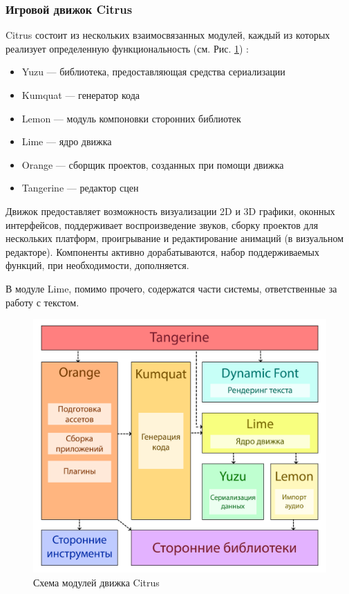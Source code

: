 \documentclass{fefu}
\begin{document}
			\subsubsection{Игровой движок Citrus}
				\par Citrus состоит из нескольких взаимосвязанных модулей, каждый из которых
				реализует определенную функциональность (см. Рис. \ref{img:CitrusScheme})
				\cite{CitrusRepo}: 
				\begin{itemize}
					\item Yuzu --- библиотека, предоставляющая средства сериализации
					\item Kumquat --- генератор кода
					\item Lemon --- модуль компоновки сторонних библиотек
					\item Lime --- ядро движка
					\item Orange --- сборщик проектов, созданных при помощи движка
					\item Tangerine --- редактор сцен
				\end{itemize}
				\par Движок предоставляет возможность визуализации 2D и 3D графики, 
				оконных интерфейсов, поддерживает воспроизведение звуков, сборку проектов для 
				нескольких платформ, проигрывание и редактирование анимаций (в визуальном 
				редакторе). Компоненты активно дорабатываются, набор поддерживаемых функций, 
				при необходимости, дополняется.
				\par В модуле Lime, помимо прочего, содержатся части системы, ответственные за
				работу с текстом.
				\begin{figure}[h]
					\centering
					\includegraphics[width=1\linewidth]{images/CitrusScheme.png}
					\caption{Схема модулей движка Citrus}
					\label{img:CitrusScheme}
				\end{figure}
\end{document}
